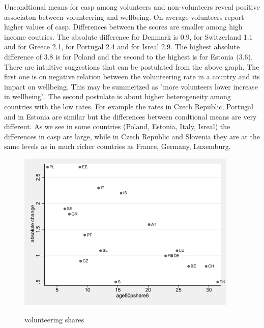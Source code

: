 \documentclass[10pt, letterpaper]{article}
\begin{document}
\begin{spacing}{1.4}
Uncondtional means for casp among volunteers and non-volunteers reveal positive associaton between volunteering and wellbeing.  On average volunteers report higher values of casp. Differences between the scores are smaller among  high income coutries. The absolute difference for Denmark  is 0.9, for Switzerland 1.1 and for Greece 2.1, for Portugal 2.4 and for Isreal 2.9. The highest absolute difference of 3.8 is for Poland and the second to the highest is for Estonia (3.6). There are intuitive suggestions that can be postulated from the above graph. The first one is on negative relation between the volunteering rate in a country and its impact on wellbeing. This may be summerized as "more volunteers lower increase in wellbeing". The second postulate is about higher heterogeneity among countries with the low rates. For example the rates in Czech Republic, Portugal and in Estonia are similar but the differences between condtional means are very different. As we see in some countries (Poland, Estonia, Italy, Isreal) the differences in casp are large, while in Czech Republic and Slovenia they are at the same levels as in much richer countries as France, Germany, Luxemburg.     


\begin{figure}[H]
 \includegraphics[height=3in]{abs_casp.pdf}
 \centering
 \label{fig:oecd_50p}
\caption{volunteering shares}
\end{figure}



\end{spacing}
\end{document}
